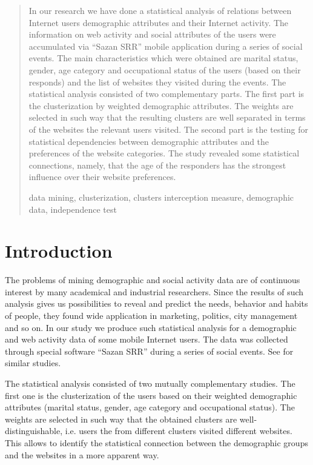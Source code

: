 \documentclass[runningheads,a4paper]{llncs}
\newcommand{\keywords}[1]{\par\addvspace\baselineskip
\noindent\keywordname\enspace\ignorespaces#1}
\begin{document}
\begin{abstract}
In our research we have done a statistical analysis of relations between Internet users demographic attributes and their Internet activity. The information on web activity and social attributes of the users were accumulated via ``Sazan SRR'' mobile application during a series of social events. The main characteristics which were obtained are marital status, gender, age category and occupational status of the users (based on their responds) and the list of websites they visited during the events. The statistical analysis consisted of two complementary parts. The first part is the clusterization by weighted demographic attributes. The weights are selected in such way that the resulting clusters are well separated in terms of the websites the relevant users visited. The second part is the testing for statistical dependencies between demographic attributes and the preferences of the website categories. The study revealed some statistical connections, namely, that the age of the responders has the strongest influence over their website preferences.


\keywords{data mining, clusterization, clusters interception measure, demographic data, independence test}
\end{abstract}


\section{Introduction}

The problems of mining demographic and social activity data are of continuous interest by many academical and industrial researchers. Since the results of such analysis gives us possibilities to reveal and predict the needs, behavior and habits of people, they
found wide application in marketing, politics, city management and so on. In our study we produce such statistical analysis for a demographic and web activity data of some mobile Internet users. The data was collected through special software ``Sazan SRR'' during a series of social events. See \cite{sim-1,sim-2,sim-3,sim-4,sim-5} for similar studies.

The statistical analysis consisted of two mutually complementary studies. The first one is the clusterization of the users based on their weighted demographic attributes (marital status, gender, age category and occupational status). The weights are selected in such way that the obtained clusters are well-distinguishable, i.e. users the from different clusters visited different websites. This allows to identify the statistical connection between the demographic groups and the websites in a more apparent way.
\end{document}
